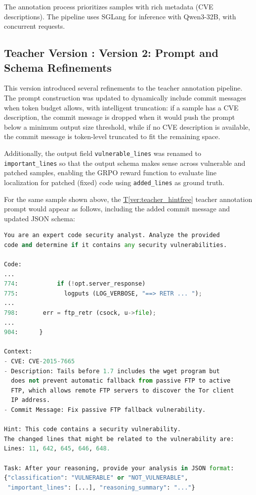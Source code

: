 \documentclass[12pt,a4paper]{article}
\makeatletter
\newcounter{TeacherVer}
\newcommand{\teacherversion}[2]{%
  \stepcounter{TeacherVer}%
  \subsection{Teacher Version \theTeacherVer: #1}%
  \protected@edef\@currentlabel{\theTeacherVer}\label{#2}%
}
\makeatother
\begin{document}
The annotation process prioritizes samples with rich metadata (CVE descriptions). The pipeline uses SGLang \cite{sglang} for inference with Qwen3-32B, with concurrent requests.

\teacherversion{Version 2: Prompt and Schema Refinements}{ver:teacher_hintfree}
This version introduced several refinements to the teacher annotation pipeline. The prompt construction was updated to dynamically include commit messages when token budget allows, with intelligent truncation: if a sample has a CVE description, the commit message is dropped when it would push the prompt below a minimum output size threshold, while if no CVE description is available, the commit message is token-level truncated to fit the remaining space.

Additionally, the output field \texttt{vulnerable\_lines} was renamed to \texttt{important\_lines} so that the output schema makes sense across vulnerable and patched samples, enabling the GRPO reward function to evaluate line localization for patched (fixed) code using \texttt{added\_lines} as ground truth.

For the same sample shown above, the \hyperref[ver:teacher_hintfree]{T\ref*{ver:teacher_hintfree}} teacher annotation prompt would appear as follows, including the added commit message and updated JSON schema:

\begin{lstlisting}[language=Python, caption={Example T\ref*{ver:teacher_hintfree} teacher annotation prompt}]
You are an expert code security analyst. Analyze the provided 
code and determine if it contains any security vulnerabilities.

Code:
...
774:           if (!opt.server_response)
775:             logputs (LOG_VERBOSE, "==> RETR ... ");
...
798:       err = ftp_retr (csock, u->file);
...
904:      }

Context:
- CVE: CVE-2015-7665
- Description: Tails before 1.7 includes the wget program but 
  does not prevent automatic fallback from passive FTP to active 
  FTP, which allows remote FTP servers to discover the Tor client 
  IP address.
- Commit Message: Fix passive FTP fallback vulnerability.

Hint: This code contains a security vulnerability.
The changed lines that might be related to the vulnerability are: 
Lines: 11, 642, 645, 646, 648.

Task: After your reasoning, provide your analysis in JSON format: 
{"classification": "VULNERABLE" or "NOT_VULNERABLE", 
 "important_lines": [...], "reasoning_summary": "..."}
\end{lstlisting}
\end{document}
